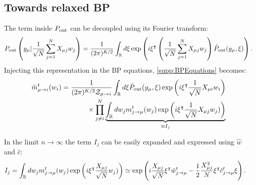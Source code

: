 \documentclass[aip,jmp,amsmath,amssymb,reprint]{revtex4}
\begin{document}
\subsection{Towards relaxed BP}
\label{appendix:towardsrBP}
The term inside $P_{\rm out}$ can be decoupled using its Fourier transform:
\begin{equation*}
P_{\rm out}\left (y_{\mu} | \displaystyle \frac{1}{\sqrt{N}} \sum_{j=1}^N  X_{\mu j}w_{j} \right) = \frac{1}{(2\pi)^{K/2}}
\int_{\mathbb{R}} d \xi \exp\left( i \xi^\intercal \left( \displaystyle \frac{1}{\sqrt{N}} \sum_{j=1}^N  X_{\mu j}w_{j}\right) \hat{P}_{\rm out}(y_{\mu} , \xi )    \right).	
\end{equation*}
Injecting this representation in the BP equations, \eqref{supp:BPEquations} becomes:
\begin{align*}
&\tilde{m}_{\mu \to i}^t (w_i ) = 
\frac{1}{(2\pi)^{K/2}\mathcal{Z}_{\mu\to i} }
\int_{\mathbb{R}} d\xi \hat{P}_{\rm out}(y_{\mu} , \xi)  
\exp\left(i  \xi^\intercal \frac{1}{\sqrt{N}} X_{\mu i} w_i \right)\nonumber\\
 &\qquad\qquad\qquad\qquad\times\prod\limits_{j\neq i}^N  \underbrace{\int_{\mathbb{R}} dw_j 
		 m_{j \to \mu}^t (w_j ) \exp\left( i  \xi^\intercal \frac{1}{\sqrt{N}} X_{\mu j} w_j ) \right)}_{\equiv I_j}
		 \label{mtilde}
\end{align*}

In the limit $n\to \infty$ the term $I_j$ can be easily expanded and expressed using $\hat{w}$ and $\hat{c}$:
\begin{align*}
 I_j &= \int_{\mathbb{R}} dw_j
		 m_{j \to \mu}^t (w_j ) \exp\left( i  \xi^\intercal \frac{X_{\mu j}}{\sqrt{N}} w_j ) \right) \simeq  \exp\left( i \frac{X_{\mu j}}{\sqrt{N}}\xi^\intercal  \hat{w}_{j\to \mu}^t -  \frac{1}{2}\frac{X_{\mu j}^2}{N} \xi^\intercal  \hat{c}_{j\to \mu}^t  \xi\right) .
\end{align*} 
\end{document}
